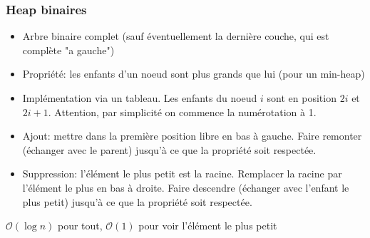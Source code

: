 \documentclass[8pt,aspectratio=169]{beamer}
\begin{document}
\begin{frame}
\frametitle{Heap binaires}
\begin{itemize}
	\item Arbre binaire complet (sauf éventuellement la dernière couche, qui est complète "a gauche")
	\item Propriété: les enfants d'un noeud sont plus grands que lui (pour un min-heap)
	\item Implémentation via un tableau. Les enfants du noeud $i$ sont en position $2i$ et $2i+1$. Attention, par simplicité on commence la numérotation à 1.
	\item Ajout: mettre dans la première position libre en bas à gauche. Faire remonter (échanger avec le parent) jusqu'à ce que la propriété soit respectée.
	\item Suppression: l'élément le plus petit est la racine. Remplacer la racine par l'élément le plus en bas à droite. Faire descendre (échanger avec l'enfant le plus petit) jusqu'à ce que la propriété soit respectée.
\end{itemize}
$\mathcal{O}(\log n)$ pour tout, $\mathcal{O}(1)$ pour voir l'élément le plus petit
\end{frame}
\end{document}
